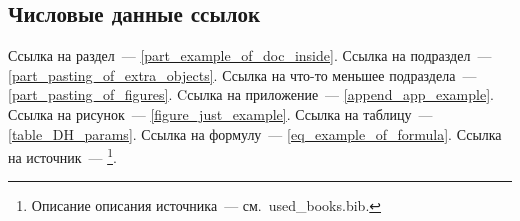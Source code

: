 \subsection{Числовые данные ссылок}\label{part_editing_of_refs}
Ссылка на раздел~--- \ref{part_example_of_doc_inside}.
Ссылка на подраздел~--- \ref{part_pasting_of_extra_objects}.
Ссылка на что-то меньшее подраздела~--- \ref{part_pasting_of_figures}.
Cсылка на приложение~--- \ref{append_app_example}.
Ссылка на рисунок~--- \ref{figure_just_example}.
Ссылка на таблицу~--- \ref{table_DH_params}.
Ссылка на формулу~--- \eqref{eq_example_of_formula}.
Ссылка на источник~--- \cite{UrcolaIROS08}\footnote{Описание описания источника~--- см.~used\_books.bib.}.
\newpage